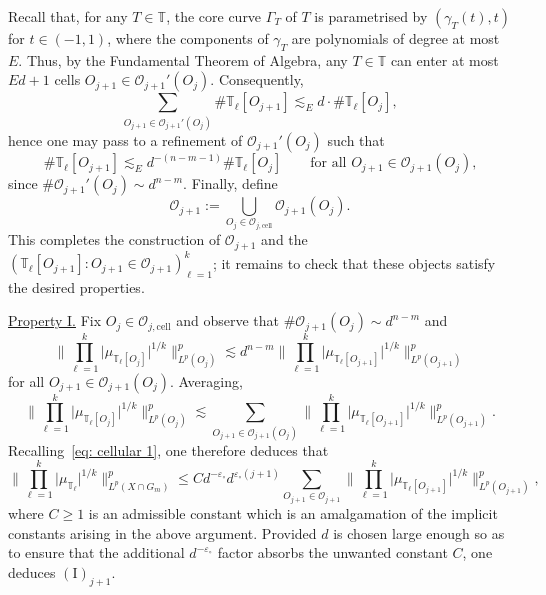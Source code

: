 \documentclass[reqno]{amsart}
\numberwithin{equation}{section}
\newcommand{\T}{\mathbb{T}}
\newcommand{\cO}{\mathcal{O}}
\theoremstyle{plain}
\theoremstyle{definition}
\newcommand{\cell}{\mathrm{cell}}
\begin{document}
Recall that, for any $T \in \T$, the core curve $\Gamma_T$ of $T$ is parametrised by $(\gamma_T(t), t)$ for $t \in (-1,1)$, where the components of $\gamma_T$ are polynomials of degree at most $E$. Thus, by the Fundamental Theorem of Algebra, any $T \in \T$ can enter at most $Ed + 1$ cells $O_{j+1} \in \cO_{j+1}'(O_j)$. Consequently, 
\begin{equation}\label{eq: cellular 2}
    \sum_{O_{j+1} \in \cO_{j+1}'(O_j)} \#\T_{\ell}[O_{j+1}] \lesssim_E d \cdot \#\T_{\ell}[O_j],
\end{equation}
hence one may pass to a refinement of $\cO_{j+1}'(O_j)$ such that
 \begin{equation}\label{eq: cellular 3}
    \#\T_{\ell}[O_{j+1}] \lesssim_E d^{-(n-m -1)} \#\T_{\ell}[O_j] \qquad \textrm{for all $O_{j+1} \in \cO_{j+1}(O_j)$,}
\end{equation}
since $\#\cO_{j+1}'(O_j)\sim d^{n-m}$. Finally, define 
 \begin{equation*}
 \cO_{j+1} := \bigcup_{O_j \in \cO_{j, \cell}} \cO_{j+1}(O_j).
\end{equation*}
This completes the construction of $\cO_{j+1}$ and the $(\T_{\ell}[O_{j+1}] : O_{j+1} \in \cO_{j+1})_{\ell = 1}^k$; it remains to check that these objects satisfy the desired properties.\medskip

%
%
%
\noindent\underline{Property I.} Fix $O_j \in \cO_{j,\cell}$ and observe that $\#\cO_{j+1}(O_j) \sim d^{n-m}$ and 
\begin{equation*}
    \Big\|\prod_{\ell = 1}^k \big| \mu_{\T_{\ell}[O_j]} \big|^{1/k} \Big\|_{L^p(O_j)}^p \lesssim d^{n-m} \Big\|\prod_{\ell = 1}^k \big| \mu_{\T_{\ell}[O_{j+1}]} \big|^{1/k} \Big\|_{L^p(O_{j+1})}^p
\end{equation*}
for all $O_{j+1} \in \cO_{j+1}(O_j)$. Averaging,
\begin{equation*}
    \Big\|\prod_{\ell = 1}^k \big| \mu_{\T_{\ell}[O_j]} \big|^{1/k} \Big\|_{L^p(O_j)}^p \lesssim \sum_{O_{j+1} \in \cO_{j+1}(O_j)}  \Big\|\prod_{\ell = 1}^k \big| \mu_{\T_{\ell}[O_{j+1}]}  \big|^{1/k} \Big\|_{L^p(O_{j+1})}^p.
\end{equation*}
Recalling~\eqref{eq: cellular 1}, one therefore deduces that
\begin{equation*}
    \Big\|\prod_{\ell = 1}^k \big| \mu_{\T_{\ell}} \big|^{1/k} \Big\|_{L^p(X \cap G_m)}^p \leq C d^{-\varepsilon_{\circ}} d^{\varepsilon_{\circ}(j+1)} \sum_{O_{j+1} \in \cO_{j+1}}  \Big\|\prod_{\ell = 1}^k \big| \mu_{\T_{\ell}[O_{j+1}]}  \big|^{1/k} \Big\|_{L^p(O_{j+1})}^p,
\end{equation*}
where $C \geq 1$ is an admissible constant which is an amalgamation of the implicit constants arising in the above argument. Provided $d$ is chosen large enough so as to ensure that the additional $d^{-\varepsilon_{\circ}}$ factor absorbs the unwanted constant $C$, one deduces $(\mathrm{I})_{j+1}$.\medskip
\end{document}
